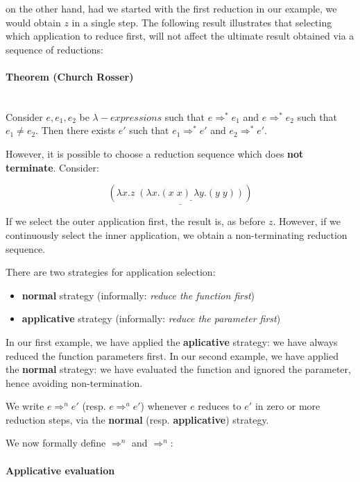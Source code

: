 on the other hand, had we started with the first reduction in our example, we would obtain $z$ in a single step. The following result illustrates that selecting which application to reduce first, will not affect the ultimate result obtained via a sequence of reductions:

\paragraph{ Theorem (Church Rosser) }\hfill\\
Consider $e,e_1,e_2$ be $\lambda-expressions$ such that $e \Rightarrow^* e_1$ and $e \Rightarrow^* e_2$ such that $e_1\neq e_2$. Then there exists $e'$ such that $e_1 \Rightarrow^* e'$ and $e_2 \Rightarrow^* e'$.

However, it is possible to choose a reduction sequence which does \textbf{not terminate}. Consider:

$$ \underline{(\lambda x.z\;\underline{(\lambda x.(x\;x)\;\lambda y.(y\;y))})}$$

If we select the outer application first, the result is, as before $z$. However, if we continuously select the inner application, we obtain a non-terminating reduction sequence.

There are two strategies for application selection:
\begin{itemize}
	\item  \textbf{normal} strategy (informally: \textit{reduce the function first})
	\item  \textbf{applicative} strategy (informally: \textit{reduce the parameter first})
\end{itemize}

In our first example, we have applied the \textbf{aplicative} strategy: we have always reduced the function parameters first.
In our second example, we have applied the \textbf{normal} strategy: we have evaluated the function and ignored the parameter, hence avoiding non-termination.

We write $e \Rightarrow^n e'$ (resp. $e \Rightarrow^a e'$) whenever $e$ reduces to $e'$ in zero or more reduction steps, via the \textbf{normal} (resp. \textbf{applicative}) strategy.

We now formally define $\Rightarrow^n$ and $\Rightarrow^n$:

\paragraph{ Applicative evaluation }\hfill\\

